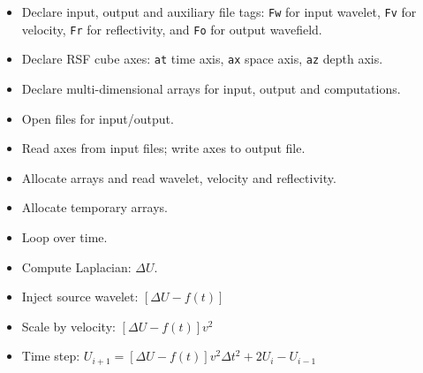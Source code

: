 \begin{itemize}
\item Declare input, output and auxiliary file tags:
\texttt{Fw} for input wavelet, 
\texttt{Fv} for velocity,
\texttt{Fr} for reflectivity, and
\texttt{Fo} for output wavefield.
\tiny

\normalsize

\item Declare RSF cube axes:
\texttt{at} time axis,
\texttt{ax} space axis,
\texttt{az} depth axis.
\tiny

\normalsize

\item Declare multi-dimensional arrays for input, output and computations.
\tiny

\normalsize

\item Open files for input/output.
\tiny

\normalsize

\item Read axes from input files; write axes to output file.
\tiny

\normalsize

\item Allocate arrays and read wavelet, velocity and reflectivity.
\tiny

\normalsize

\item Allocate temporary arrays.
\tiny

\normalsize

\item Loop over time.
\tiny

\normalsize

\item Compute Laplacian: $\Delta U$.
\tiny

\normalsize

\item Inject source wavelet: $\left[ \Delta U - f(t) \right]$
\tiny

\normalsize

\item Scale by velocity: $\left[ \Delta U - f(t) \right] v^2$
\tiny

\normalsize

\item Time step: 
$U_{i+1} = \left[ \Delta U -f(t) \right] v^2 \Delta t^2 + 2 U_{i} - U_{i-1}$
\tiny

\normalsize

\end{itemize}

